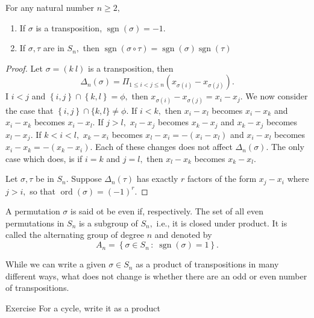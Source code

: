 \begin{theorem}[asd]
	For any natural number $ n \geq 2,$
	\begin{enumerate}
		\item If $ \sigma$ is a transposition, $ \operatorname{sgn} ( \sigma) = -1.$
		\item If $ \sigma, \tau$ are in $S_n,$ then $ \operatorname{sgn}( \sigma %
			\circ \tau) = \operatorname{sgn}( \sigma) \operatorname{sgn} ( \tau ) $
	\end{enumerate} 
\end{theorem}

\begin{proof}
	Let $ \sigma = (k \ l) $ is a transposition, then
	$$ \Delta_n( \sigma ) = \Pi _{1 \leq i < j \leq n} \left( x _{ \sigma(i) }
	 - x _{ \sigma(j)} \right).$$ 
	 I $i < j$ and $ \left\{ i, j  \right\}  \cap  \left\{ k,l \right\} = \phi,$
	 then $ x _{\sigma(i)} - x _{\sigma(j)} = x_i - x_j. $
	 We now consider the case that $ \left\{ i,j \right\} \cap \{ k, l \} \not = \phi.$
	 If $i < k ,$
	 then $x _i - x_ l $ becomes $x_i - x_k$ and $x_i - x_k$ becomes $x_i - x_l.$
	 If $j > l,$
	 $x_l - x_j$ becomes $x_k - x_j$ and
	 $x_k - x_j$ becomes $x_l - x_j.$
	 If $ k < i < l,$ $x_k - x_i$ becomes $x_l - x_i = -(x_i - x_l) $ 
	 and $ x_i  -x_l$ becomes $x_i - x_k = -(x_k - x_i).$
	Each of these changes does not affect $\Delta_n( \sigma).$
	 The only case which does, is if $i = k $ and $ j = l,$ then $ x_l - x_k$ becomes $x_k - x_l.$

	 Let $\sigma, \tau$ be in $S_n.$ Suppose $ \Delta_n( \tau)$ has exactly $r$ factors
	  of the form $x_j - x_i$ where $j > i,$ so that
	  $\operatorname{ ord} ( \sigma) = (-1) ^r.$ 
\end{proof}


\begin{definition}
	A permutation $ \sigma$ is said ot be even if, respectively.
	The set of all even permutations in $S_n$ is a subgroup of $S_n,$ i.e.,
	it is closed under product. It is called the alternating group of degree $n$
	and denoted by
	$$ A_n = \left\{  \sigma \in S_n \, : \; \operatorname{sgn}( \sigma) = 1 \right\}. $$
\end{definition}


\begin{remark}
	While we can write a given $ \sigma \in S_n$ as a product of transpositions in many different ways,
	what does not change is whether there are an odd or even number of transpositions.
\end{remark}

Exercise
For a cycle, write it as a product
